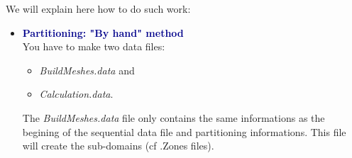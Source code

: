 We will explain here how to do such work:
\begin{itemize}
\item \textbf{\textcolor{darkblue}{Partitioning: "By hand" method}}\\
You have to make two data files:
\begin{itemize}
\item \textit{BuildMeshes.data} and 
\item \textit{Calculation.data}.
\end{itemize}

The \textit{BuildMeshes.data} file only contains the same informations as the 
begining of the sequential data file and partitioning informations.
This file will create the sub-domains (cf .Zones files).


\begin{center}
\end{center}


\end{itemize}
